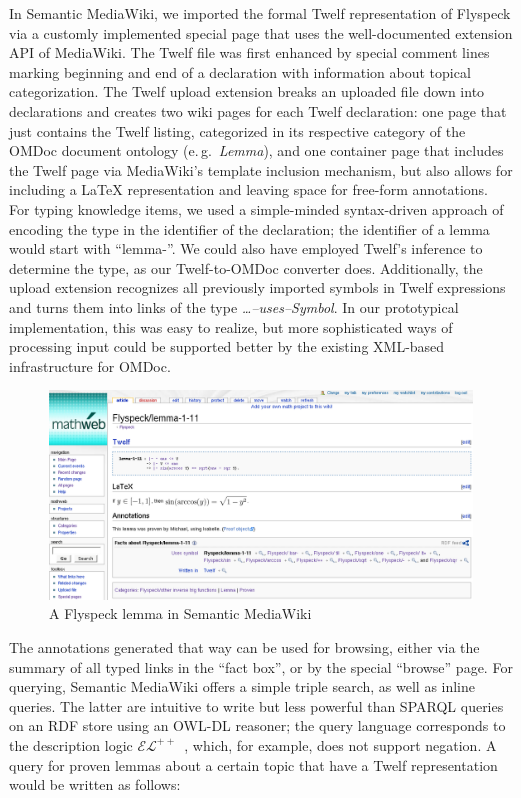 \documentclass{llncs}
\begin{document}
In Semantic MediaWiki, we imported the formal Twelf representation of Flyspeck via a
customly implemented special page that uses the well-documented extension API of
MediaWiki.  The Twelf file was first enhanced by special comment lines marking beginning
and end of a declaration with information
about topical categorization.  The Twelf upload extension breaks an uploaded file down
into declarations and creates two wiki pages for each Twelf declaration: one page that
just contains the Twelf listing, categorized in its respective category of the OMDoc
document ontology (e.\,g.\ \textit{Lemma}), and one container page that includes the Twelf
page via MediaWiki's template inclusion mechanism, but also allows for including a
{\LaTeX} representation and leaving space for free-form annotations.  For typing knowledge
items, we used a simple-minded syntax-driven approach of encoding the type in the
identifier of the declaration; the identifier of a lemma would start with ``lemma-''.  We
could also have employed Twelf's inference to determine the type, as our Twelf-to-OMDoc converter does.  Additionally, the upload
extension recognizes all previously imported symbols in Twelf expressions and turns them
into links of the type \textit{\ldots--uses--Symbol}.  In our prototypical implementation,
this was easy to realize, but more sophisticated ways of processing input could be
supported better by the existing XML-based infrastructure for OMDoc.

\begin{figure}
  \centering
  \includegraphics[width=\textwidth]{smw-lemma}
  \caption{A Flyspeck lemma in Semantic MediaWiki}
  \label{fig:smw-lemma}
\end{figure}

The annotations generated that way can be used for browsing, either via the summary of all
typed links in the ``fact box'', or by the special ``browse'' page.  For querying,
Semantic MediaWiki offers a simple triple search, as well as inline queries.  The latter
are intuitive to write but less powerful than SPARQL queries on an RDF store using an
OWL-DL reasoner; the query language corresponds to the description logic
$\mathcal{EL}^{++}$~\cite{KrSchVr:semwiki-reasoning07}, which, for example, does not
support negation.  A query for proven lemmas about a certain topic that have a Twelf
representation would be written as follows:
\end{document}

